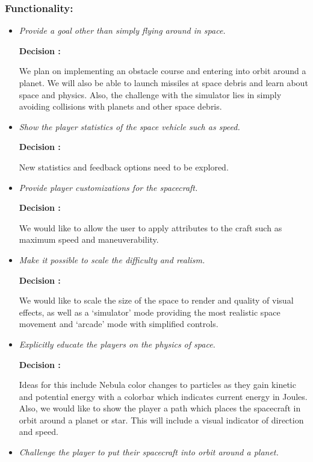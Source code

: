 \subsubsection*{Functionality:}
\begin{itemize}
  \item \emph{Provide a goal other than simply flying around in space.}
        
        \textbf{Decision : } \parbox[t]{5in}{We plan on implementing an obstacle course and entering into orbit around a planet.  We will also be able to launch missiles at space debris and learn about space and physics.  Also, the challenge with the simulator lies in simply avoiding collisions with planets and other space debris.}

  \item \emph{Show the player statistics of the space vehicle such as speed.}
        
        \textbf{Decision : } \parbox[t]{5in}{New statistics and feedback options need to be explored.}

  \item \emph{Provide player customizations for the spacecraft.}
        
        \textbf{Decision : } \parbox[t]{5in}{We would like to allow the user to apply attributes to the craft such as maximum speed and maneuverability.}

  \item \emph{Make it possible to scale the difficulty and realism.}
        
        \textbf{Decision : } \parbox[t]{5in}{We would like to scale the size of the space to render and quality of visual effects, as well as a `simulator' mode providing the most realistic space movement and `arcade' mode with simplified controls.}

  \item \emph{Explicitly educate the players on the physics of space.}
        
        \textbf{Decision : } \parbox[t]{5in}{Ideas for this include Nebula color changes to particles as they gain kinetic and potential energy with a colorbar which indicates current energy in Joules.  Also, we would like to show the player a path which places the spacecraft in orbit around a planet or star.  This will include a visual indicator of direction and speed.}

  \item \emph{Challenge the player to put their spacecraft into orbit around a planet.}
        

\end{itemize}
